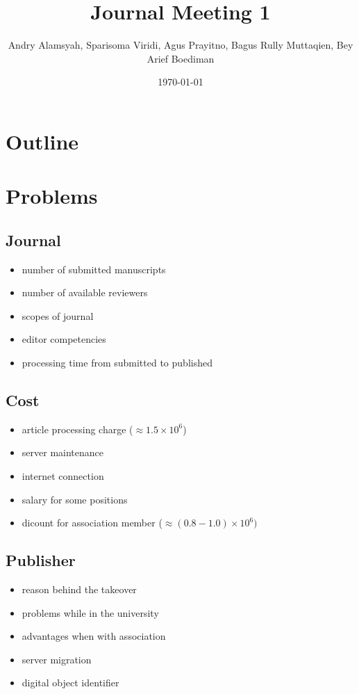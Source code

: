 \documentclass{beamer}
\title{Journal Meeting 1}
\author{Andry Alamsyah, Sparisoma Viridi, Agus Prayitno, \newline Bagus Rully Muttaqien, Bey Arief Boediman}
\date{\today}
\institute{Asosiasi Ilmuwan Data Indonesia}
\begin{document}
\begin{frame}
\titlepage
\end{frame}

\section*{Outline}

\begin{frame}
\tableofcontents
\end{frame}

\section{Problems}

\subsection{Journal}
\begin{frame}
  \begin{itemize}
    \item number of submitted manuscripts
    \item number of available reviewers
    \item scopes of journal 
    \item editor competencies
    \item processing time from submitted to published
  \end{itemize}
\end{frame}

\subsection{Cost}
\begin{frame}
  \begin{itemize}
    \item article processing charge ($\approx 1.5\times 10^6$)
    \item server maintenance
    \item internet connection
    \item salary for some positions 
    \item dicount for association member ($ \approx(0.8 - 1.0) \times 10^6)$
  \end{itemize}
\end{frame}

\subsection{Publisher}
\begin{frame}
  \begin{itemize}
    \item reason behind the takeover
    \item problems while in the university
    \item advantages when with association
    \item server migration
    \item digital object identifier
  \end{itemize}
\end{frame}
\end{document}
